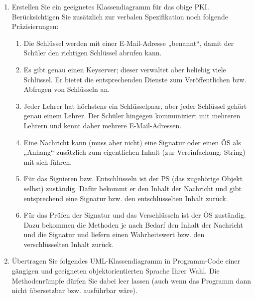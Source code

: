 \documentclass{bschlangaul-aufgabe}
\begin{document}
\begin{enumerate}

\item Erstellen Sie ein geeignetes Klassendiagramm für das obige PKI.
Berücksichtigen Sie zusätzlich zur verbalen Spezifikation noch folgende
Präzisierungen:

\begin{enumerate}


\item Die Schlüssel werden mit einer E-Mail-Adresse „benannt“, damit der
Schüler den richtigen Schlüssel abrufen kann.


\item Es gibt genau einen Keyserver; dieser verwaltet aber beliebig
viele Schlüssel. Er bietet die entsprechenden Dienste zum
Veröffentlichen bzw. Abfragen von Schlüsseln an.


\item Jeder Lehrer hat höchstens ein Schlüsselpaar, aber jeder Schlüssel
gehört genau einem Lehrer. Der Schüler hingegen kommuniziert mit
mehreren Lehrern und kennt daher mehrere E-Mail-Adressen.


\item Eine Nachricht kann (muss aber nicht) eine Signatur oder einen ÖS
als „Anhang“ zusätzlich zum eigentlichen Inhalt (zur Vereinfachung:
String) mit sich führen.


\item Für das Signieren bzw. Entschlüsseln ist der PS (das zugehörige
Objekt selbst) zuständig. Dafür bekommt er den Inhalt der Nachricht und
gibt entsprechend eine Signatur bzw. den entschlüsselten Inhalt zurück.


\item Für das Prüfen der Signatur und das Verschlüsseln ist der ÖS
zuständig. Dazu bekommen die Methoden je nach Bedarf den Inhalt der
Nachricht und die Signatur und liefern einen Wahrheitswert bzw. den
verschlüsselten Inhalt zurück.

\end{enumerate}


\item Übertragen Sie folgendes UML-Klassendiagramm in Programm-Code
einer gängigen und geeigneten objektorientierten Sprache Ihrer Wahl. Die
Methodenrümpfe dürfen Sie dabei leer lassen (auch wenn das Programm dann
nicht übersetzbar bzw. ausführbar wäre).


\end{enumerate}
\end{document}
